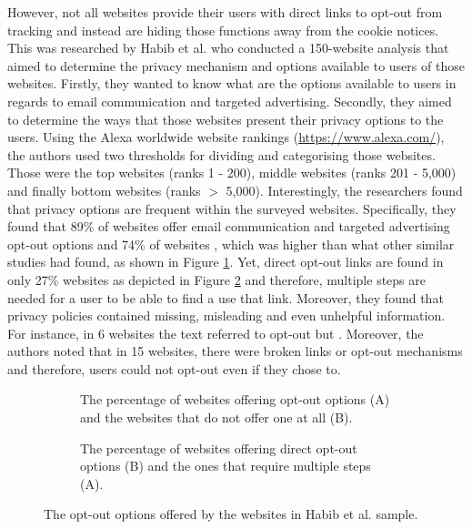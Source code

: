 \documentclass[../main.tex]{subfiles}
\begin{document}
However, not all websites provide their users with direct links to opt-out from tracking and instead are hiding those functions away from the cookie notices. This was researched by Habib et al. \cite{habib2019empirical} who conducted a 150-website analysis that aimed to determine the privacy mechanism and options available to users of those websites. Firstly, they wanted to know what are the options available to users in regards to email communication and targeted advertising. Secondly, they aimed to determine the ways that those websites present their privacy options to the users. Using the Alexa worldwide website rankings (\url{https://www.alexa.com/}), the authors used two thresholds for dividing and categorising those websites. Those were the top websites (ranks 1 - 200), middle websites (ranks 201 - 5,000) and finally bottom websites (ranks $>$ 5,000). Interestingly, the researchers found that privacy options are frequent within the surveyed websites. Specifically, they found that 89\% of websites offer email communication and targeted advertising opt-out options and 74\% of websites , which was higher than what other similar studies had found, as shown in Figure \ref{fig:habib_a}. Yet, direct opt-out links are found in only 27\% websites as depicted in Figure \ref{fig:habib_b} and therefore, multiple steps are needed for a user to be able to find a use that link. Moreover, they found that privacy policies contained missing, misleading and even unhelpful information. For instance, in 6 websites the text referred to opt-out but . Moreover, the authors noted that in 15 websites, there were broken links or opt-out mechanisms and therefore, users could not opt-out even if they chose to.

\begin{figure}[ht]
    \centering
    \begin{subfigure}[b]{0.45\textwidth}
        \centering
        \caption{The percentage of websites offering opt-out options (A) and the websites that do not offer one at all (B).}
        \label{fig:habib_a}
    \end{subfigure}
    \hfill
    \begin{subfigure}[b]{0.45\textwidth}
        \centering
        \caption{The percentage of websites offering direct opt-out options (B) and the ones that require multiple steps (A).}
        \label{fig:habib_b}
    \end{subfigure}
    \caption{The opt-out options offered by the websites in Habib et al. sample.}
    \label{fig:habib}
\end{figure}
\end{document}
